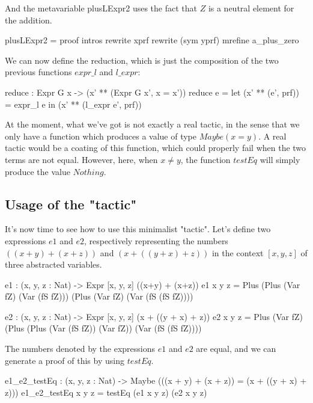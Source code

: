 \documentclass{sigplanconf}
\begin{document}
And the metavariable plusLExpr2 uses the fact that $Z$ is a neutral element for the addition.

\begin{code}[caption=Proof of the metavariable plusLExpr2, captionpos=b, label=lst1:haskell2]
plusLExpr2 = proof
  intros
  rewrite xprf 
  rewrite (sym yprf)
  mrefine a_plus_zero
\end{code}

We can now define the reduction, which is just the composition of the two previous functions $expr\_l$ and $l\_expr$:

\begin{code}[caption=Reduction function, captionpos=b, label=lst1:haskell2]
  reduce : Expr G x -> 
           (x' ** (Expr G x', x = x'))
  reduce e = 
     let (x' ** (e', prf)) = expr_l e in
         (x' ** (l_expr e', prf))
\end{code}

At the moment, what we've got is not exactly a real tactic, in the sense that we only have a function which produces a value of type $Maybe (x = y)$. A real tactic would be a coating of this function, which could properly fail when the two terms are not equal. However, here, when $x\ne y$, the function $testEq$ will simply produce the value $Nothing$. \\

\subsection{Usage of the "tactic"}

It's now time to see how to use this minimalist "tactic".
Let's define two expressions $e1$ and $e2$, respectively representing the numbers $((x + y) + (x + z))$ and $(x + ((y + x) + z))$ in the context $[x, y, z]$ of three abstracted variables.

\begin{code}[caption=Two test expressions, captionpos=b, label=lst1:haskell2]
e1 : (x, y, z : Nat) 
    -> Expr [x, y, z] ((x+y) + (x+z))
e1 x y z = Plus (Plus (Var fZ) 
                      (Var (fS fZ))) 
                (Plus (Var fZ) 
                      (Var (fS (fS fZ))))

e2 : (x, y, z : Nat) 
     -> Expr [x, y, z] (x + ((y + x) + z))
e2 x y z = Plus (Var fZ) 
                (Plus (Plus (Var (fS fZ)) 
                            (Var fZ)) 
                      (Var (fS (fS fZ))))
\end{code}

The numbers denoted by the expressions $e1$ and $e2$ are equal, and we can generate a proof of this by using $testEq$.
\begin{code}[caption=Test of equality betwen e1 and e2, captionpos=b, label=lst1:haskell2]
e1_e2_testEq : (x, y, z : Nat) 
       -> Maybe (((x + y) + (x + z)) 
                  = (x + ((y + x) + z)))
e1_e2_testEq x y z = testEq (e1 x y z)
                            (e2 x y z)
\end{code}
\end{document}
